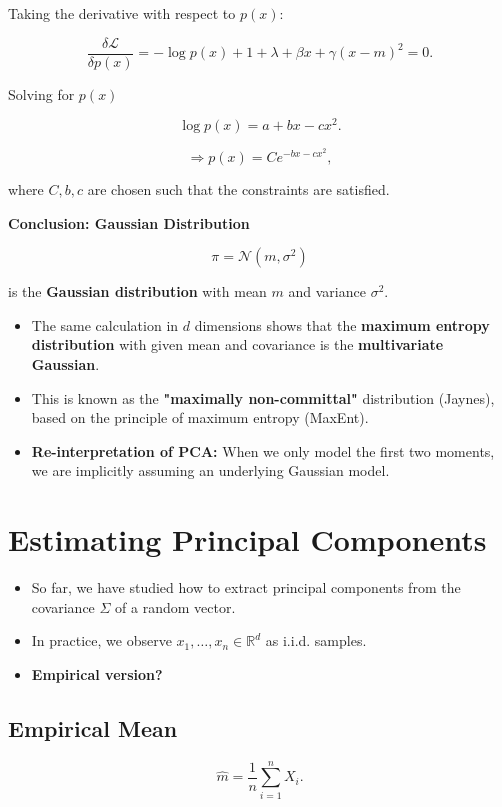 \documentclass{article}
\begin{document}
Taking the derivative with respect to \( p(x) \):

\[
\frac{\delta \mathcal{L}}{\delta p(x)} = -\log p(x) + 1 + \lambda + \beta x + \gamma (x - m)^2 = 0.
\]

Solving for \( p(x) \)

\[
\log p(x) = a + bx - c x^2.
\]

\[
\Rightarrow p(x) = C e^{-bx - c x^2},
\]

where \( C, b, c \) are chosen such that the constraints are satisfied.

\textbf{Conclusion: Gaussian Distribution}

\[
\pi = \mathcal{N}(m, \sigma^2)
\]

is the \textbf{Gaussian distribution} with mean \( m \) and variance \( \sigma^2 \).



\begin{itemize}
    \item The same calculation in \( d \) dimensions shows that the \textbf{maximum entropy distribution} with given mean and covariance is the \textbf{multivariate Gaussian}.
    \item This is known as the \textbf{"maximally non-committal"} distribution (Jaynes), based on the principle of maximum entropy (MaxEnt).
    \item \textbf{Re-interpretation of PCA:} When we only model the first two moments, we are implicitly assuming an underlying Gaussian model.
\end{itemize}

\section{Estimating Principal Components}

\begin{itemize}
    \item So far, we have studied how to extract principal components from the covariance \( \Sigma \) of a random vector.
    \item In practice, we observe \( x_1, \dots, x_n \in \mathbb{R}^d \) as i.i.d. samples.
    \item \textbf{Empirical version?}
\end{itemize}


\subsection*{Empirical Mean}
\[
\hat{m} = \frac{1}{n} \sum_{i=1}^{n} X_i.
\]
\end{document}
